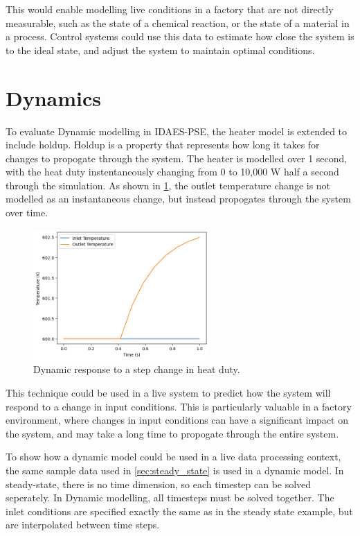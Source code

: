 \documentclass[12pt]{article}
\begin{document}
This would enable modelling live conditions in a factory that are not directly measurable, such as the state of a chemical reaction, or the state of a material in a process. Control systems could use this data to estimate how close the system is to the ideal state, and adjust the system to maintain optimal conditions.



\section{Dynamics}

To evaluate Dynamic modelling in IDAES-PSE, the heater model is extended to include holdup. Holdup is a property that represents how long it takes for changes to propogate through the system. The heater is modelled over 1 second, with the heat duty instentaneously changing from 0 to 10,000 W half a second through the simulation. As shown in \cref{fig:dynamic_test}, the outlet temperature change is not modelled as an instantaneous change, but instead propogates through the system over time.

\begin{figure}[h]
    \centering
    \includegraphics[width=0.6\textwidth]{dynamic_test.png}
    \caption{Dynamic response to a step change in heat duty.}
    \label{fig:dynamic_test}
\end{figure}

This technique could be used in a live system to predict how the system will respond to a change in input conditions. This is particularly valuable in a factory environment, where changes in input conditions can have a significant impact on the system, and may take a long time to propogate through the entire system. 

To show how a dynamic model could be used in a live data processing context, the same sample data used in \cref{sec:steady_state} is used in a dynamic model. In steady-state, there is no time dimension, so each timestep can be solved seperately. In Dynamic modelling, all timesteps must be solved together. The inlet conditions are specified exactly the same as in the steady state example, but are interpolated between time steps. 
\end{document}
